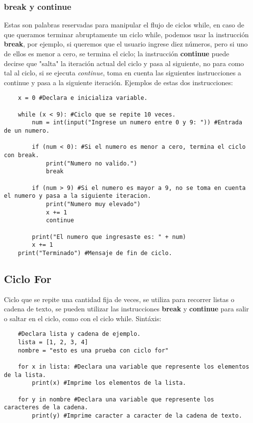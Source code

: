 \subsubsection{break y continue}
\hspace{0.55cm}Estas son palabras reservadas para manipular el flujo de ciclos while, en caso de que queramos terminar abruptamente un ciclo while, podemos usar la instrucción \textbf{break}, por ejemplo, si queremos que el usuario ingrese diez números, pero si uno de ellos es menor a cero, se termina el ciclo; la instrucción \textbf{continue} puede decirse que "salta" la iteración actual del ciclo y pasa al siguiente, no para como tal al ciclo, si se ejecuta \textit{continue}, toma en cuenta las siguientes instrucciones a continue y pasa a la siguiente iteración. Ejemplos de estas dos instrucciones:
\begin{lstlisting}
	x = 0 #Declara e inicializa variable.
	
	while (x < 9): #Ciclo que se repite 10 veces.
		num = int(input("Ingrese un numero entre 0 y 9: ")) #Entrada de un numero.
		
		if (num < 0): #Si el numero es menor a cero, termina el ciclo con break.
			print("Numero no valido.")
			break
		
		if (num > 9) #Si el numero es mayor a 9, no se toma en cuenta el numero y pasa a la siguiente iteracion.
			print("Numero muy elevado")
			x += 1
			continue

		print("El numero que ingresaste es: " + num)
		x += 1
	print("Terminado") #Mensaje de fin de ciclo.
\end{lstlisting}


\subsection{Ciclo For}
\hspace{0.55cm}Ciclo que se repite una cantidad fija de veces, se utiliza para recorrer listas o cadena de texto, se pueden utilizar las instrucciones \textbf{break} y \textbf{continue} para salir o saltar en el ciclo, como con el ciclo while. Sintáxis:
\begin{lstlisting}
	#Declara lista y cadena de ejemplo.
	lista = [1, 2, 3, 4]
	nombre = "esto es una prueba con ciclo for"
	
	for x in lista: #Declara una variable que represente los elementos de la lista.
		print(x) #Imprime los elementos de la lista.
		
	for y in nombre #Declara una variable que represente los caracteres de la cadena.
		print(y) #Imprime caracter a caracter de la cadena de texto.
\end{lstlisting}



